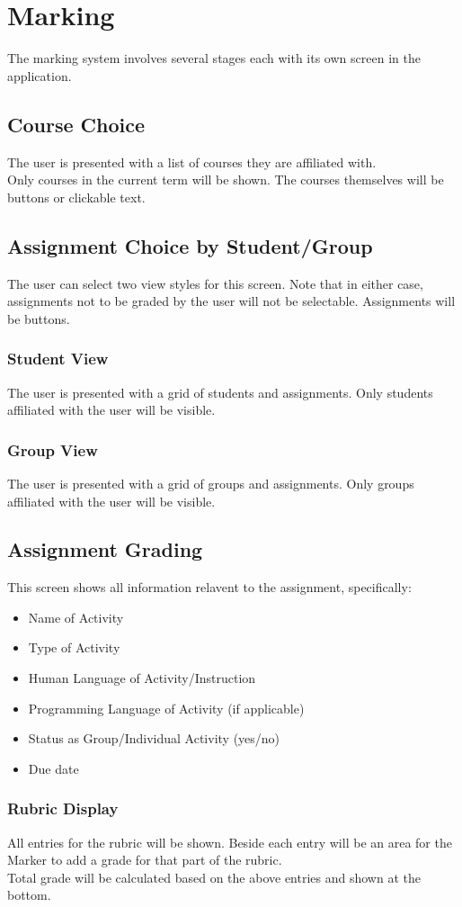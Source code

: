 \documentclass{article}
\begin{document}
\section{Marking}
The marking system involves several stages each with its own screen in
the application.
\subsection{Course Choice}
The user is presented with a list of courses they are affiliated with. \\
Only courses in the current term will be shown. The courses themselves
will be buttons or clickable text.
\subsection{Assignment Choice by Student/Group}
The user can select two view styles for this screen. Note that in either case,
assignments not to be graded by the user will not be selectable. Assignments
will be buttons.
\subsubsection{Student View}
The user is presented with a grid of students and assignments. Only students
affiliated with the user will be visible.
\subsubsection{Group View}
The user is presented with a grid of groups and assignments. Only groups
affiliated with the user will be visible.
\subsection{Assignment Grading}
This screen shows all information relavent to the assignment, specifically:
\begin{itemize}
  \item Name of Activity
  \item Type of Activity
  \item Human Language of Activity/Instruction
  \item Programming Language of Activity (if applicable)
  \item Status as Group/Individual Activity (yes/no)
  \item Due date
\end{itemize}
\subsubsection{Rubric Display}
All entries for the rubric will be shown. Beside each entry will be an
area for the Marker to add a grade for that part of the rubric.\\
Total grade will be calculated based on the above entries and shown at the
bottom.
\end{document}
